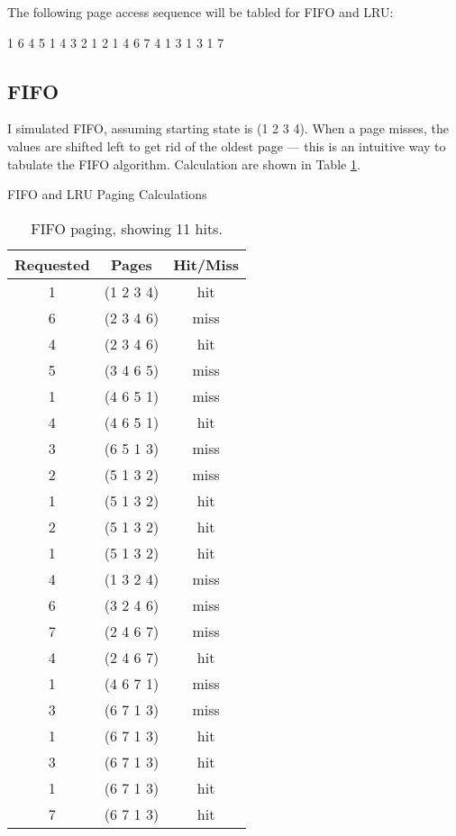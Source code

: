 \documentclass[12pt,letterpaper]{article}
\begin{document}
The following page access sequence will be tabled for FIFO and LRU:

1 6 4 5 1 4 3 2 1 2 1 4 6 7 4 1 3 1 3 1 7

\subsection*{FIFO}

I simulated FIFO, assuming starting state is (1 2 3 4). When a page misses, the values are shifted
left to get rid of the oldest page --- this is an intuitive way to tabulate the FIFO algorithm.
Calculation are shown in Table \ref{table:fifopage}.
\begin{table}[!htb]
    \caption{FIFO and LRU Paging Calculations}
    \begin{subtable}{.5\linewidth}
      \centering
        \begin{tabular}{c|c|c}
        Requested & Pages & Hit/Miss\\
        \hline
        1 & (1 2 3 4) & hit\\
        6 & (2 3 4 6) & miss\\
        4 & (2 3 4 6) & hit\\
        5 & (3 4 6 5) & miss\\
        1 & (4 6 5 1) & miss\\
        4 & (4 6 5 1) & hit\\
        3 & (6 5 1 3) & miss\\
        2 & (5 1 3 2) & miss\\
        1 & (5 1 3 2) & hit\\
        2 & (5 1 3 2) & hit\\
        1 & (5 1 3 2) & hit\\
        4 & (1 3 2 4) & miss\\
        6 & (3 2 4 6) & miss\\
        7 & (2 4 6 7) & miss\\
        4 & (2 4 6 7) & hit\\
        1 & (4 6 7 1) & miss\\
        3 & (6 7 1 3) & miss\\
        1 & (6 7 1 3) & hit\\
        3 & (6 7 1 3) & hit\\
        1 & (6 7 1 3) & hit\\
        7 & (6 7 1 3) & hit
        \end{tabular}
        \caption{FIFO paging, showing 11 hits.}
        \label{table:fifopage}

\end{subtable}
\end{table}
\end{document}
